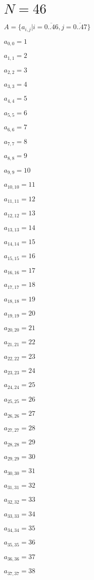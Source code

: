 \documentclass[a4paper,12pt]{article}
\begin{document}
\section{ $N = 46$ }
$A = \{ a _{ i, j } | i = \overline { 0..46 }, j = \overline { 0..47 } \}$

$a _{ 0, 0 } = 1$

$a _{ 1, 1 } = 2$

$a _{ 2, 2 } = 3$

$a _{ 3, 3 } = 4$

$a _{ 4, 4 } = 5$

$a _{ 5, 5 } = 6$

$a _{ 6, 6 } = 7$

$a _{ 7, 7 } = 8$

$a _{ 8, 8 } = 9$

$a _{ 9, 9 } = 10$

$a _{ 10, 10 } = 11$

$a _{ 11, 11 } = 12$

$a _{ 12, 12 } = 13$

$a _{ 13, 13 } = 14$

$a _{ 14, 14 } = 15$

$a _{ 15, 15 } = 16$

$a _{ 16, 16 } = 17$

$a _{ 17, 17 } = 18$

$a _{ 18, 18 } = 19$

$a _{ 19, 19 } = 20$

$a _{ 20, 20 } = 21$

$a _{ 21, 21 } = 22$

$a _{ 22, 22 } = 23$

$a _{ 23, 23 } = 24$

$a _{ 24, 24 } = 25$

$a _{ 25, 25 } = 26$

$a _{ 26, 26 } = 27$

$a _{ 27, 27 } = 28$

$a _{ 28, 28 } = 29$

$a _{ 29, 29 } = 30$

$a _{ 30, 30 } = 31$

$a _{ 31, 31 } = 32$

$a _{ 32, 32 } = 33$

$a _{ 33, 33 } = 34$

$a _{ 34, 34 } = 35$

$a _{ 35, 35 } = 36$

$a _{ 36, 36 } = 37$

$a _{ 37, 37 } = 38$
\end{document}
